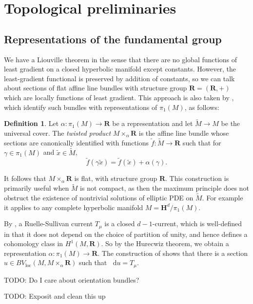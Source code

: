 \documentclass[reqno,10pt]{amsart}
\newcommand{\RR}{\mathbf{R}}
\newcommand{\Hyp}{\mathbf H}
\newcommand*\dif{\mathop{}\!\mathrm{d}}
\newcommand{\dfn}[1]{\emph{#1}\index{#1}}
\newcommand{\loc}{\mathrm{loc}}
\theoremstyle{definition}
\newtheorem{definition}[theorem]{Definition}
\numberwithin{equation}{section}
\begin{document}
\section{Topological preliminaries}\label{LamPrelim}
\subsection{Representations of the fundamental group}
We have a Liouville theorem in the sense that there are no global functions of least gradient on a closed hyperbolic manifold except constants.
However, the least-gradient functional is preserved by addition of constants, so we can talk about sections of flat affine line bundles with structure group $\RR = (\RR, +)$ which are locally functions of least gradient.
This approach is also taken by \cite[\S2.1]{daskalopoulos2020transverse}, which identify such bundles with representations of $\pi_1(M)$, as follows:

\begin{definition}
Let $\alpha: \pi_1(M) \to \RR$ be a representation and let $\tilde M \to M$ be the universal cover.
The \dfn{twisted product} $M \times_\alpha \RR$ is the affine line bundle whose sections are canonically identified with functions $\tilde f: \tilde M \to \RR$ such that for $\gamma \in \pi_1(M)$ and $\tilde x \in \tilde M$,
$$\tilde f(\gamma \tilde x) = \tilde f(\tilde x) + \alpha(\gamma).$$
\end{definition}

It follows that $M \times_\alpha \RR$ is flat, with structure group $\RR$.
This construction is primarily useful when $\tilde M$ is not compact, as then the maximum principle does not obstruct the existence of nontrivial solutions of elliptic PDE on $\tilde M$.
For example it applies to any complete hyperbolic manifold $M = \Hyp^d/\pi_1(M)$.

By \cite{Ruelle75}, a Ruelle-Sullivan current $T_\mu$ is a closed $d-1$-current, which is well-defined in that it does not depend on the choice of partition of unity, and hence defines a cohomology class in $H^1(M, \RR)$. So by the Hurecwiz theorem, we obtain a representation $\alpha: \pi_1(M) \to \RR$.
The construction of \cite[Theorem 8.3]{daskalopoulos2020transverse} shows that there is a section $u \in BV_\loc(M, M \times_\alpha \RR)$ such that $\dif u = T_\mu$.

TODO: Do I care about orientation bundles?

TODO: Exposit and clean this up
\end{document}
